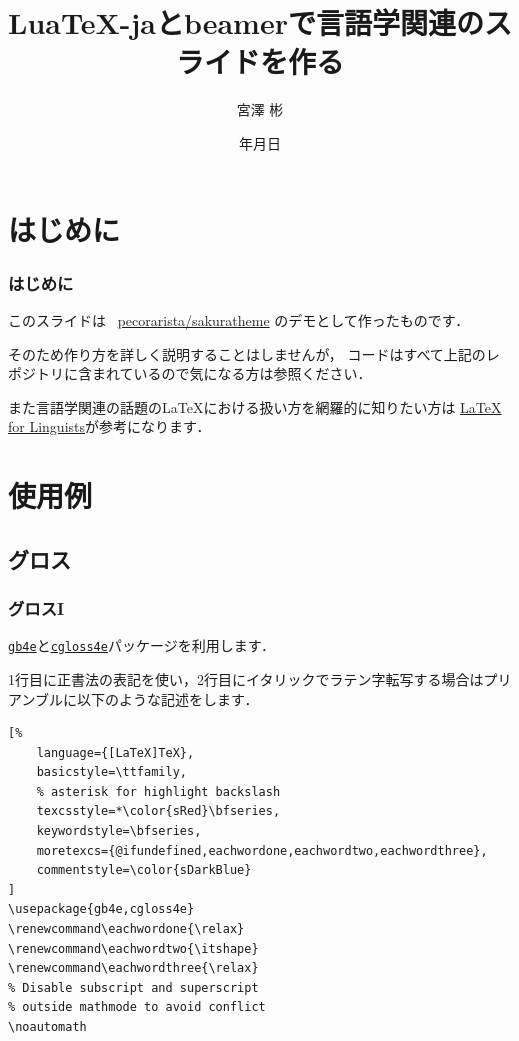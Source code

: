 \documentclass[
    12pt,
    unicode]{beamer}
\title{Lua\TeX{}-jaとbeamerで言語学関連のスライドを作る}
\institute{総合研究大学院大学}
\author{宮澤 彬}
\date{{\number\year}年{\number\month}月{\number\day}日}
\renewcommand\eachwordone{\relax}
\renewcommand\eachwordtwo{\itshape}
\renewcommand\eachwordthree{\relax}
\begin{document}
\begin{frame}
    \maketitle
\end{frame}

\section{はじめに}
\begin{frame}
    \frametitle{はじめに}
    このスライドは \faGithub\ \href{https://github.com/pecorarista/sakuratheme}{\ttfamily pecorarista/sakuratheme}
    のデモとして作ったものです．

    \bigskip

    そのため作り方を詳しく説明することはしませんが，
    コードはすべて上記のレポジトリに含まれているので気になる方は参照ください．
    \bigskip

    また言語学関連の話題の\LaTeX における扱い方を網羅的に知りたい方は
    \href{https://www1.essex.ac.uk/linguistics/external/clmt/latex4ling/}
    {LaTeX for Linguists}が参考になります．
\end{frame}

\section{使用例}
\subsection{グロス}
\begin{frame}[fragile]
\frametitle{グロスI}
\href{https://ctan.org/pkg/gb4e}{\texttt{gb4e}}と\href{https://ctan.org/pkg/gb4e}{\texttt{cgloss4e}}パッケージを利用します．

\bigskip

1行目に正書法の表記を使い，2行目にイタリックでラテン字転写する場合はプリアンブルに以下のような記述をします．
\begin{leftbar}
\begin{lstlisting}[%
    language={[LaTeX]TeX},
    basicstyle=\ttfamily,
    % asterisk for highlight backslash
    texcsstyle=*\color{sRed}\bfseries,
    keywordstyle=\bfseries,
    moretexcs={@ifundefined,eachwordone,eachwordtwo,eachwordthree},
    commentstyle=\color{sDarkBlue}
]
\usepackage{gb4e,cgloss4e}
\renewcommand\eachwordone{\relax}
\renewcommand\eachwordtwo{\itshape}
\renewcommand\eachwordthree{\relax}
% Disable subscript and superscript
% outside mathmode to avoid conflict
\noautomath
\end{lstlisting}
\end{leftbar}
\end{frame}
\end{document}
